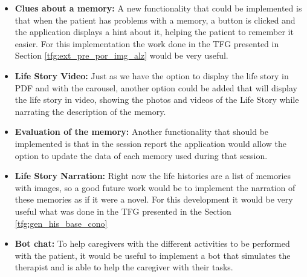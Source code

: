 \begin{itemize}
\item \textbf{Clues about a memory:} A new functionality that could be implemented is that when the patient has problems with a memory, a button is clicked and the application displays a hint about it, helping the patient to remember it easier. For this implementation the work done in the TFG presented in Section \ref{tfg:ext_pre_por_img_alz} would be very useful.
\item \textbf{Life Story Video:} Just as we have the option to display the life story in PDF and with the carousel, another option could be added that will display the life story in video, showing the photos and videos of the Life Story while narrating the description of the memory.
\item \textbf{Evaluation of the memory:} Another functionality that should be implemented is that in the session report the application would allow the option to update the data of each memory used during that session. 
\item \textbf{Life Story Narration:} Right now the life histories are a list of memories with images, so a good future work would be to implement the narration of these memories as if it were a novel. For this development it would be very useful what was done in the TFG presented in the Section \ref{tfg:gen_his_base_cono}
\item \textbf{Bot chat:} To help caregivers with the different activities to be performed with the patient, it would be useful to implement a bot that simulates the therapist and is able to help the caregiver with their tasks.
\end{itemize}
